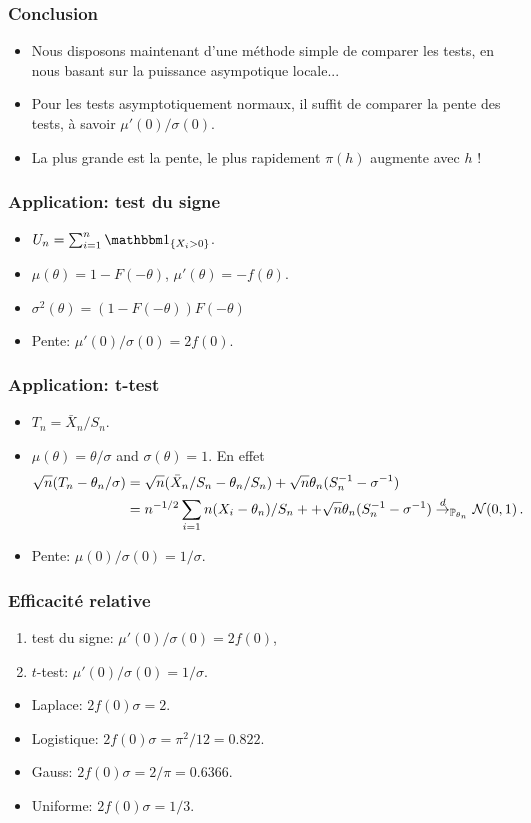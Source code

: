 \begin{frame}
\frametitle{Conclusion}
\begin{itemize}
\item Nous disposons maintenant d'une méthode simple de comparer les tests, en nous basant sur la puissance asympotique locale...
\item Pour les tests asymptotiquement normaux, il suffit de comparer la \alert{pente} des tests, à savoir \alert{$\mu'(0)/\sigma(0)$}.
\item La plus grande est la pente, le plus rapidement $\pi(h)$ augmente avec $h$ !
\end{itemize}
\end{frame}


\begin{frame}
\frametitle{Application: test du signe}
\begin{itemize}
\item $U_n= \sum_{i=1}^n \indi{X_i > 0}$. 
\item $\mu(\theta)= 1 - F(-\theta)$, $\mu'(\theta)= - f(\theta)$.
\item $\sigma^2(\theta)= (1 - F(-\theta)) F(-\theta)$
\item \alert{Pente:} $\mu'(0)/\sigma(0)= 2 f(0)$. 
\end{itemize}
\end{frame}

\begin{frame}
\frametitle{Application: t-test}
\begin{itemize}
\item $T_n = \bar{X}_n/S_n$.
\item $\mu(\theta)= \theta/\sigma$ and $\sigma(\theta)= 1$. En effet
\begin{align*}
\sqrt{n} ( T_n - \theta_n/\sigma) 
&= \sqrt{n} ( \bar{X}_n / S_n - \theta_n / S_n) + \sqrt{n} \theta_n (S_n^{-1} - \sigma^{-1}) \\
&= n^{-1/2} \sum_{i=1}n (X_i - \theta_n)/S_n + + \sqrt{n} \theta_n (S_n^{-1} - \sigma^{-1}) \stackrel{d}{\rightarrow}_{\operatorname{{\mathbb P}}_{\theta_n}} \mathcal{N}(0,1) \,.
\end{align*}
\item \alert{Pente:} $\mu(0)/\sigma(0)= 1/\sigma$.
\end{itemize}
\end{frame}

\begin{frame}
\frametitle{Efficacité relative}
\begin{enumerate}
\item test du signe: $\mu'(0)/\sigma(0)=2 f(0)$,
\item $t$-test: $\mu'(0)/\sigma(0)=1/\sigma$.
\end{enumerate}

\begin{itemize}
\item Laplace: $2 f(0) \sigma = 2$.
\item Logistique: $2 f(0) \sigma = \pi^2/12=0.822$.
\item Gauss: $2 f(0) \sigma = 2/\pi=0.6366$.
\item Uniforme: $2 f(0) \sigma = 1/3$.
\end{itemize}
\end{frame}

